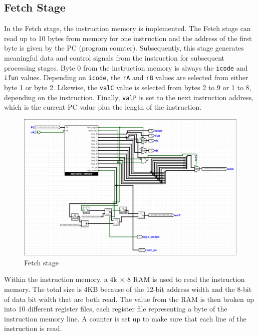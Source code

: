 \documentclass{article}
\begin{document}
\subsection{Fetch Stage}
In the Fetch stage, the instruction memory is implemented. 
The Fetch stage can read up to 10 bytes from memory for one instruction and the address of the first byte is given by the PC (program counter). 
Subsequently, this stage generates meaningful data and control signals from the instruction for subsequent processing stages. 
Byte 0 from the instruction memory is always the \lstinline{icode} and \lstinline{ifun} values.
Depending on \lstinline{icode}, the \lstinline{rA} and \lstinline{rB} values are selected from either byte 1 or byte 2.
Likewise, the \lstinline{valC} value is selected from bytes 2 to 9 or 1 to 8, depending on the instruction.
Finally, \lstinline{valP} is set to the next instruction address, which is the current PC value plus the length of the instruction.

\begin{figure}[H]
    \centering
    \includegraphics[width=\textwidth]{./images/fetch.png}
    \caption{Fetch stage}
\end{figure}

Within the instruction memory, a 4k $\times$ 8 RAM is used to read the instruction memory. 
The total size is 4KB because of the 12-bit address width and the 8-bit of data bit width that are both read. 
The value from the RAM is then broken up into 10 different register files, each register file representing a byte of the instruction memory line. 
A counter is set up to make sure that each line of the instruction is read.
\end{document}
